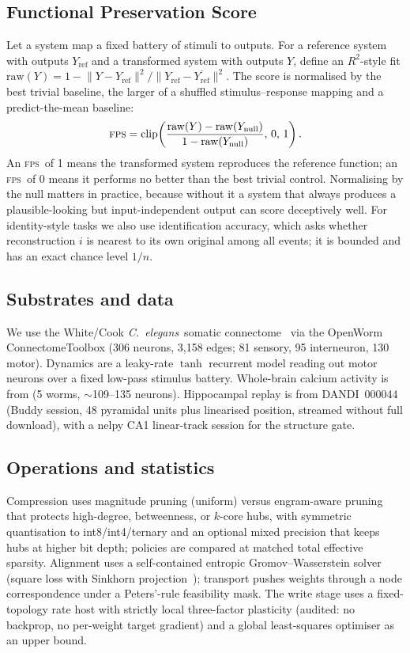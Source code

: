 \documentclass[11pt]{article}
\newcommand{\fps}{\textsc{fps}}
\newcommand{\celegans}{\textit{C.\ elegans}}
\begin{document}
\subsection{Functional Preservation Score}\label{sec:fps}
Let a system map a fixed battery of stimuli to outputs. For a reference system with outputs
$Y_{\mathrm{ref}}$ and a transformed system with outputs $Y$, define an $R^2$-style fit
$\mathrm{raw}(Y)=1-\lVert Y-Y_{\mathrm{ref}}\rVert^2/\lVert Y_{\mathrm{ref}}-\overline{Y_{\mathrm{ref}}}\rVert^2$.
The score is normalised by the best trivial baseline, the larger of a shuffled stimulus--response
mapping and a predict-the-mean baseline:
\begin{equation}
\fps = \mathrm{clip}\!\left(\frac{\mathrm{raw}(Y)-\mathrm{raw}(Y_{\mathrm{null}})}{1-\mathrm{raw}(Y_{\mathrm{null}})},\,0,\,1\right).
\end{equation}
An \fps\ of 1 means the transformed system reproduces the reference function; an \fps\ of 0 means
it performs no better than the best trivial control. Normalising by the null matters in practice,
because without it a system that always produces a plausible-looking but input-independent output
can score deceptively well. For identity-style tasks we also use identification accuracy, which
asks whether reconstruction $i$ is nearest to its own original among all events; it is bounded and
has an exact chance level $1/n$.

\subsection{Substrates and data}
We use the White/Cook \celegans\ somatic connectome~\citep{white1986structure,cook2019connectome}
via the OpenWorm ConnectomeToolbox (306 neurons, 3{,}158 edges; 81 sensory, 95 interneuron, 130
motor). Dynamics are a leaky-rate $\tanh$ recurrent model reading out motor neurons over a fixed
low-pass stimulus battery. Whole-brain calcium activity is from \citet{kato2015global} (5 worms,
$\sim$109--135 neurons). Hippocampal replay is from DANDI~000044~\citep{grosmark2016diversity,diba2007forward}
(Buddy session, 48 pyramidal units plus linearised position, streamed without full download), with
a nelpy CA1 linear-track session for the structure gate.

\subsection{Operations and statistics}\label{sec:stats}
Compression uses magnitude pruning (uniform) versus engram-aware pruning that protects
high-degree, betweenness, or $k$-core hubs, with symmetric quantisation to int8/int4/ternary and
an optional mixed precision that keeps hubs at higher bit depth; policies are compared at matched
total effective sparsity. Alignment uses a self-contained entropic Gromov--Wasserstein solver
(square loss with Sinkhorn projection~\citep{peyre2016gw}); transport pushes weights through a
node correspondence under a Peters'-rule feasibility mask. The write stage uses a fixed-topology
rate host with strictly local three-factor plasticity (audited: no backprop, no per-weight target
gradient) and a global least-squares optimiser as an upper bound.
\end{document}
